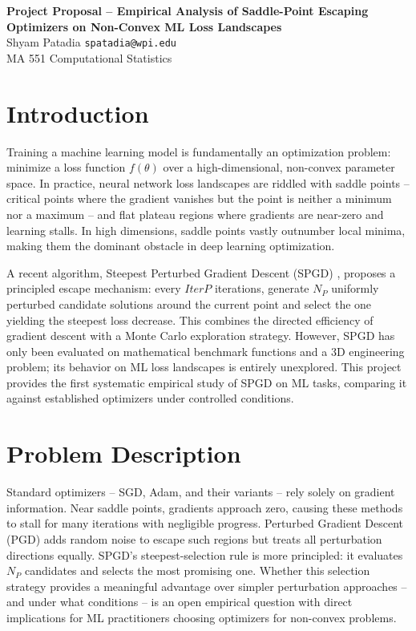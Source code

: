 \documentclass[11pt]{article}
\begin{document}
\begin{center}
    {\large \textbf{Project Proposal -- Empirical Analysis of Saddle-Point Escaping Optimizers on Non-Convex ML Loss Landscapes}}\\[4pt]
    Shyam Patadia \quad \texttt{spatadia@wpi.edu}\\
    MA 551 Computational Statistics
\end{center}

\section{Introduction}

Training a machine learning model is fundamentally an optimization problem: minimize a loss function $f(\theta)$ over a high-dimensional, non-convex parameter space. In practice, neural network loss landscapes are riddled with saddle points -- critical points where the gradient vanishes but the point is neither a minimum nor a maximum -- and flat plateau regions where gradients are near-zero and learning stalls. In high dimensions, saddle points vastly outnumber local minima, making them the dominant obstacle in deep learning optimization.

A recent algorithm, Steepest Perturbed Gradient Descent (SPGD) \cite{vahedi2024spgd}, proposes a principled escape mechanism: every $\textit{IterP}$ iterations, generate $N_P$ uniformly perturbed candidate solutions around the current point and select the one yielding the steepest loss decrease. This combines the directed efficiency of gradient descent with a Monte Carlo exploration strategy. However, SPGD has only been evaluated on mathematical benchmark functions and a 3D engineering problem; its behavior on ML loss landscapes is entirely unexplored. This project provides the first systematic empirical study of SPGD on ML tasks, comparing it against established optimizers under controlled conditions.

\section{Problem Description}

Standard optimizers -- SGD, Adam, and their variants -- rely solely on gradient information. Near saddle points, gradients approach zero, causing these methods to stall for many iterations with negligible progress. Perturbed Gradient Descent (PGD) \cite{jin2017escape} adds random noise to escape such regions but treats all perturbation directions equally. SPGD's steepest-selection rule is more principled: it evaluates $N_P$ candidates and selects the most promising one. Whether this selection strategy provides a meaningful advantage over simpler perturbation approaches -- and under what conditions -- is an open empirical question with direct implications for ML practitioners choosing optimizers for non-convex problems.
\end{document}
